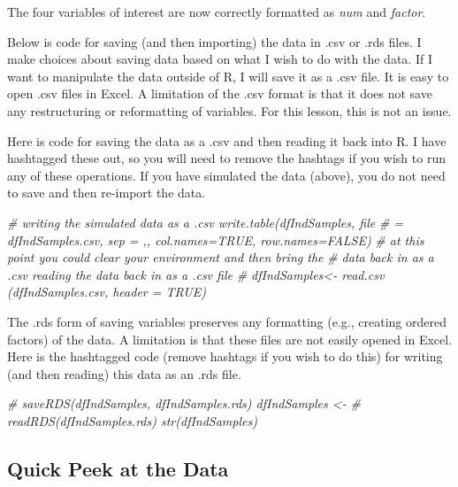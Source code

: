 \documentclass[
  11pt,
]{book}
\newenvironment{Shaded}{\begin{snugshade}}{\end{snugshade}}
\newcommand{\CommentTok}[1]{\textcolor[rgb]{0.37,0.37,0.37}{\textit{#1}}}
\begin{document}
The four variables of interest are now correctly formatted as \emph{num} and \emph{factor}.

Below is code for saving (and then importing) the data in .csv or .rds files. I make choices about saving data based on what I wish to do with the data. If I want to manipulate the data outside of R, I will save it as a .csv file. It is easy to open .csv files in Excel. A limitation of the .csv format is that it does not save any restructuring or reformatting of variables. For this lesson, this is not an issue.

Here is code for saving the data as a .csv and then reading it back into R. I have hashtagged these out, so you will need to remove the hashtags if you wish to run any of these operations. If you have simulated the data (above), you do not need to save and then re-import the data.

\begin{Shaded}
\begin{Highlighting}[]
\CommentTok{\# writing the simulated data as a .csv write.table(dfIndSamples, file}
\CommentTok{\# = \textquotesingle{}dfIndSamples.csv\textquotesingle{}, sep = \textquotesingle{},\textquotesingle{}, col.names=TRUE, row.names=FALSE)}
\CommentTok{\# at this point you could clear your environment and then bring the}
\CommentTok{\# data back in as a .csv reading the data back in as a .csv file}
\CommentTok{\# dfIndSamples\textless{}{-} read.csv (\textquotesingle{}dfIndSamples.csv\textquotesingle{}, header = TRUE)}
\end{Highlighting}
\end{Shaded}

The .rds form of saving variables preserves any formatting (e.g., creating ordered factors) of the data. A limitation is that these files are not easily opened in Excel. Here is the hashtagged code (remove hashtags if you wish to do this) for writing (and then reading) this data as an .rds file.

\begin{Shaded}
\begin{Highlighting}[]
\CommentTok{\# saveRDS(dfIndSamples, \textquotesingle{}dfIndSamples.rds\textquotesingle{}) dfIndSamples \textless{}{-}}
\CommentTok{\# readRDS(\textquotesingle{}dfIndSamples.rds\textquotesingle{}) str(dfIndSamples)}
\end{Highlighting}
\end{Shaded}

\hypertarget{quick-peek-at-the-data-1}{%
\subsection{Quick Peek at the Data}\label{quick-peek-at-the-data-1}}
\end{document}
